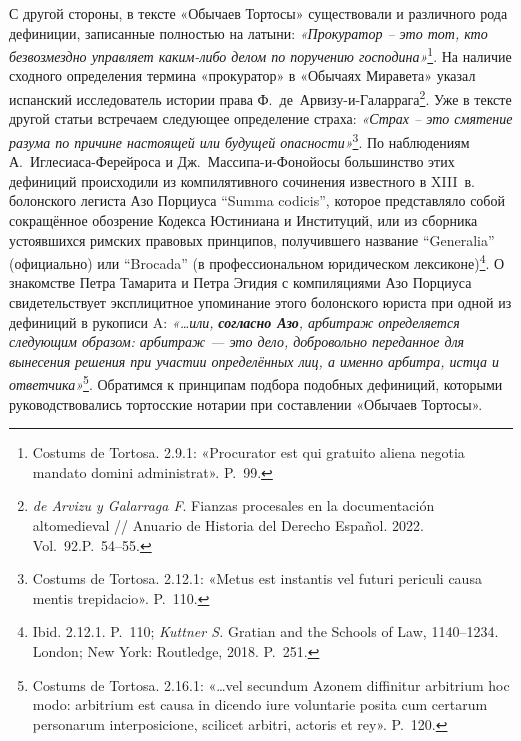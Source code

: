 С другой стороны, в тексте «Обычаев Тортосы» существовали и различного рода дефиниции, записанные полностью на латыни: \emph{«Прокуратор -- это тот, кто безвозмездно управляет каким-либо делом по поручению господина»}\footnote{Costums de Tortosa. 2.9.1: «Procurator est qui gratuito aliena negotia mandato domini administrat». P.~99.}. На наличие сходного определения термина «прокуратор» в «Обычаях Миравета» указал испанский исследователь истории права Ф.~де~Арвизу-и-Галаррага\footnote{\emph{de Arvizu y Galarraga F}. Fianzas procesales en la documentación altomedieval // Anuario de Historia del Derecho Español. 2022. Vol.~92.P.~54--55.}. Уже в тексте другой статьи встречаем следующее определение страха: \emph{«Страх -- это смятение разума по причине настоящей или будущей опасности»}\footnote{Costums de Tortosa. 2.12.1: «Metus est instantis vel futuri periculi causa mentis trepidacio». P.~110.}. По наблюдениям А.~Иглесиаса-Ферейроса и Дж.~Массипа-и-Фонойосы большинство этих дефиниций происходили из компилятивного сочинения известного в XIII~в. болонского легиста Азо Порциуса “Summa codicis”, которое представляло собой сокращённое обозрение Кодекса Юстиниана и Институций, или из сборника устоявшихся римских правовых принципов, получившего название “Generalia” (официально) или “Brocada” (в профессиональном юридическом лексиконе)\footnote{Ibid. 2.12.1. P.~110; \emph{Kuttner S.} Gratian and the Schools of Law, 1140--1234. London; New York: Routledge, 2018. P.~251.}. О знакомстве Петра Тамарита и Петра Эгидия с компиляциями Азо Порциуса свидетельствует эксплицитное упоминание этого болонского юриста при одной из дефиниций в рукописи A: \emph{«}\emph{…или, }\textbf{\emph{согласно Азо}}\emph{, арбитраж определяется следующим образом: арбитраж --- это дело, добровольно переданное для вынесения }\emph{решения при участии определённых лиц, а именно арбитра, истца и ответчика}\emph{»}\footnote{Costums de Tortosa. 2.16.1: «…vel secundum Azonem diffinitur arbitrium hoc modo: arbitrium est causa in dicendo iure voluntarie posita cum certarum personarum interposicione, scilicet arbitri, actoris et rey». P.~120.}. Обратимся к принципам подбора подобных дефиниций, которыми руководствовались тортосские нотарии при составлении «Обычаев Тортосы».

